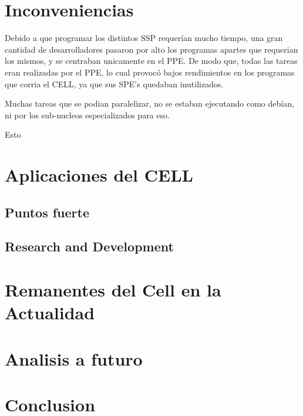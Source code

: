 \documentclass[11pt,compsoc]{IEEEtran}
\begin{document}
	
	
	\section{Inconveniencias}
	\noindent Debido a que programar los distintos SSP requerían mucho tiempo, una gran cantidad  de desarrolladores pasaron por alto los programas apartes que requerian los mismos, y se centraban unicamente en el PPE. De modo que, todas las tareas eran realizadas por el PPE, lo cual provocó bajos rendimientos en los programas que corria el CELL, ya que sus SPE's quedaban inutilizados.\newline
	
	Muchas tareas que se podian paralelizar, no se estaban ejecutando como debían, ni por los sub-nucleos especializados para eso. 
	
	Esto 
		
	
	
	\section{Aplicaciones del CELL}
	\noindent
	
	\subsection{Puntos fuerte}
	\noindent
	
	\subsection{Research and Development}
	\noindent
	
	
	
	\section{Remanentes del Cell en la Actualidad}%
	\noindent 
	
	
	
	
	
	
	
	\section{Analisis a futuro}
	\noindent 
	
	
	
	
	
	
	\section{Conclusion}
	\noindent
	
\end{document}
